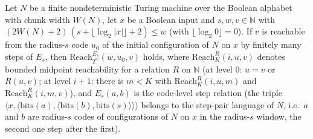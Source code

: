 \begin{theorem}
\label{Complexity.LogProg.SavitchARM.window_reach_of_rcode}
\leanok
{}
Let $N$ be a finite nondeterministic Turing machine over the Boolean alphabet with chunk width
$W(N)$, let $x$ be a Boolean input and $s,w,v\in\mathbb N$ with
$(2W(N)+2)\,(s+\lfloor\log_2|x|\rfloor+2)\le w$ (with $\lfloor\log_2 0\rfloor=0$). If $v$ is
reachable from the radius-$s$ code $u_0$ of the initial configuration of $N$ on $x$ by finitely
many steps of $E_s$, then $\mathrm{Reach}_{2^w}^{E_s}(w,u_0,v)$ holds, where $\mathrm{Reach}_K^R(i,u,v)$ denotes bounded midpoint reachability for a relation $R$ on $\mathbb N$ (at level $0$: $u=v$ or $R(u,v)$; at level $i+1$: there is $m<K$ with $\mathrm{Reach}_K^R(i,u,m)$ and $\mathrm{Reach}_K^R(i,m,v)$), and
$E_s(a,b)$ is the code-level step relation (the triple $\langle x,\langle\mathrm{bits}(a),\langle\mathrm{bits}(b),\mathrm{bits}(s)\rangle\rangle\rangle$ belongs to the step-pair language of $N$, i.e.\ $a$ and $b$ are radius-$s$ codes of configurations of $N$ on $x$ in the radius-$s$ window, the second one step after the first).
\end{theorem}


